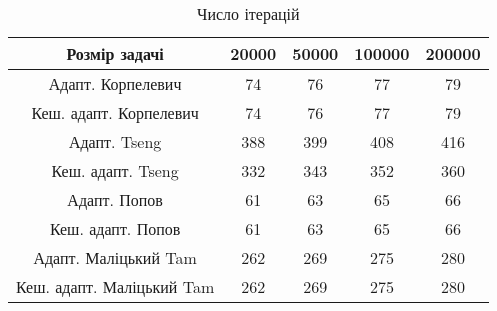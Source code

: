 \begin{table}[H]
	\centering
	\begin{tabular}{|c||c|c|c|c|}\hline
		Розмір задачі & 20000 & 50000 & 100000 & 200000 \\ \hline \hline
		Адапт. Корпелевич & 74 & 76 & 77 & 79 \\ \hline
		Кеш. адапт. Корпелевич & 74 & 76 & 77 & 79 \\ \hline
		Адапт. Tseng & 388 & 399 & 408 & 416 \\ \hline
		Кеш. адапт. Tseng & 332 & 343 & 352 & 360 \\ \hline
		Адапт. Попов & 61 & 63 & 65 & 66 \\ \hline
		Кеш. адапт. Попов & 61 & 63 & 65 & 66 \\ \hline
		Адапт. Маліцький Tam & 262 & 269 & 275 & 280 \\ \hline
		Кеш. адапт. Маліцький Tam & 262 & 269 & 275 & 280 \\ \hline
	\end{tabular}
	\caption{Число ітерацій}
\end{table}
